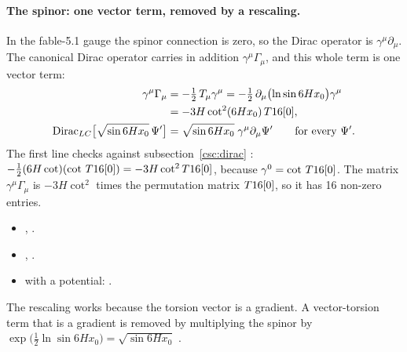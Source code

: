 \paragraph{The spinor: one vector term, removed by a rescaling.} In the fable-5.1 gauge the spinor
connection is zero, so the Dirac operator is $\gamma^\mu\partial_\mu$. The canonical Dirac operator
carries in addition $\gamma^\mu\Gamma_\mu$, and this whole term is one vector term:
\begin{align}
  \gamma^\mu\Gamma_\mu&=-\tfrac12\,T_\mu\gamma^\mu=-\tfrac12\,\partial_\mu\bigl(\ln\sin 6Hx_0\bigr)\gamma^\mu
     \notag\\
     &=-3H\cot^2(6Hx_0)\,T16[0],\label{csc:eq:vectorterm}\\
  \mathrm{Dirac}_{LC}\bigl[\sqrt{\sin 6Hx_0}\,\Psi'\bigr]&=\sqrt{\sin 6Hx_0}\;\gamma^\mu\partial_\mu\Psi'\qquad\text{for every }\Psi'.
\end{align}
The first line checks against subsection~\ref{csc:dirac} \cfderived:
$-\tfrac12(6H\cot)(\cot\,T16[0])=-3H\cot^2T16[0]$, because $\gamma^0=\cot\,T16[0]$. The matrix
$\gamma^\mu\Gamma_\mu$ is $-3H\cot^2$ times the permutation matrix $T16[0]$, so it has 16
non-zero entries.
\begin{itemize}
  \item {} , .
  \item {} , .
  \item {} with a potential: .
\end{itemize}
The rescaling works because the torsion vector is a gradient. A vector-torsion term that is a
gradient is removed by multiplying the spinor by
$\exp\bigl(\tfrac12\ln\sin 6Hx_0\bigr)=\sqrt{\sin 6Hx_0}$ \cfderived.

